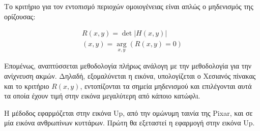 \documentclass{article}
\newcommand{\eng}[1]{\foreignlanguage{english}{#1}}
\begin{document}
Το κριτήριο για τον εντοπισμό περιοχών ομοιογένειας είναι απλώς ο μηδενισμός της ορίζουσας:

\begin{equation}
    \begin{gathered}
        R(x, y) = \det\left| H(x, y) \right|\\
        (x, y) = \underset{x, y} {\arg} \left( R(x, y) = 0 \right)
    \end{gathered}
\end{equation}

Επομένως, αναπτύσσεται μεθοδολογία πλήρως ανάλογη με την μεθοδολογία για την ανίχνευση ακμών. Δηλαδή, εξομαλύνεται η εικόνα, υπολογίζεται ο Χεσιανός πίνακας και το κριτήριο $R(x, y)$, εντοπίζονται τα σημεία μηδενισμού και επιλέγονται αυτά τα οποία έχουν τιμή στην εικόνα μεγαλύτερη από κάποιο κατώφλι.

Η μέδοδος εφαρμόζεται στην εικόνα \eng{Up}, από την ομώνυμη ταινία της \eng{Pixar}, και σε μία εικόνα ανθρωπίνων κυττάρων. Πρώτη θα εξεταστεί η εφαρμογή στην εικόνα \eng{Up}.
\end{document}
